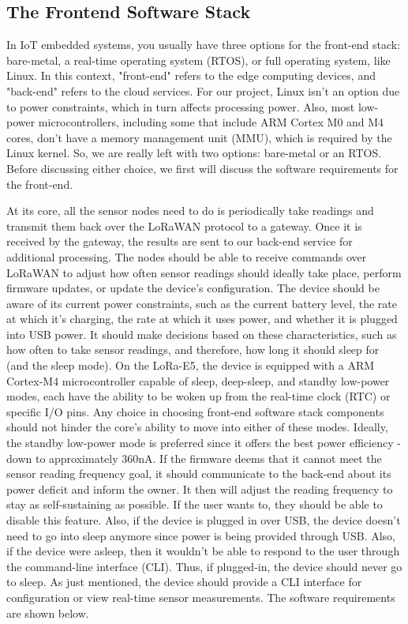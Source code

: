 \subsection{The Frontend Software Stack}
In IoT embedded systems, you usually have three options for the front-end stack:
bare-metal, a real-time operating system (RTOS), or full operating system, like
Linux. In this context, "front-end" refers to the edge computing devices, and
"back-end" refers to the cloud services. For our project, Linux isn't an option
due to power constraints, which in turn affects processing power. Also, most
low-power microcontrollers, including some that include ARM Cortex M0 and M4
cores, don't have a memory management unit (MMU), which is required by the Linux
kernel. So, we are really left with two options: bare-metal or an RTOS. Before
discussing either choice, we first will discuss the software requirements for
the front-end. 

At its core, all the sensor nodes need to do is periodically take readings and
transmit them back over the LoRaWAN protocol to a gateway. Once it is received
by the gateway, the results are sent to our back-end service for additional
processing. The nodes should be able to receive commands over LoRaWAN to adjust
how often sensor readings should ideally take place, perform firmware updates,
or update the device's configuration. The device should be aware of its current
power constraints, such as the current battery level, the rate at which it's
charging, the rate at which it uses power, and whether it is plugged into USB
power. It should make decisions based on these characteristics, such as how
often to take sensor readings, and therefore, how long it should sleep for (and
the sleep mode). On the LoRa-E5, the device is equipped with a ARM Cortex-M4
microcontroller capable of sleep, deep-sleep, and standby low-power modes, each
have the ability to be woken up from the real-time clock (RTC) or specific I/O
pins. Any choice in choosing front-end software stack components should not
hinder the core's ability to move into either of these modes. Ideally, the
standby low-power mode is preferred since it offers the best power efficiency -
down to approximately 360nA. If the firmware deems that it cannot meet the
sensor reading frequency goal, it should communicate to the back-end about its
power deficit and inform the owner. It then will adjust the reading frequency to
stay as self-sustaining as possible. If the user wants to, they should be able
to disable this feature. Also, if the device is plugged in over USB, the device
doesn't need to go into sleep anymore since power is being provided through USB.
Also, if the device were asleep, then it wouldn't be able to respond to the user
through the command-line interface (CLI). Thus, if plugged-in, the device should
never go to sleep. As just mentioned, the device should provide a CLI interface
for configuration or view real-time sensor measurements. The software
requirements are shown below.


